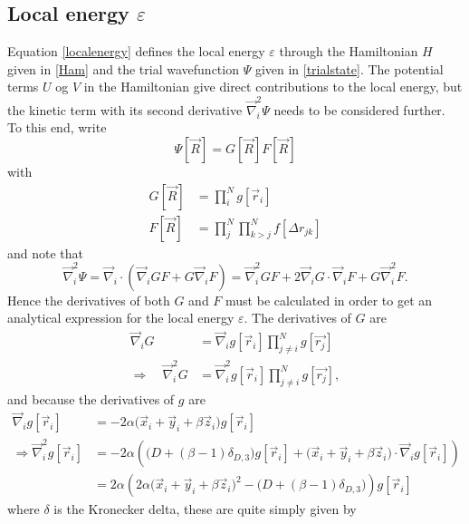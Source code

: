 \documentclass[a4paper,8pt]{article}
\begin{document}
\subsection{Local energy $\varepsilon$}\label{derLocalenergy}
Equation \eqref{localenergy} defines the local energy $\varepsilon$ through the Hamiltonian $H$ given in \eqref{Ham} and the trial wavefunction $\Psi$ given in \eqref{trialstate}. The potential terms $U$ og $V$ in the Hamiltonian give direct contributions to the local energy, but the kinetic term with its second derivative $\vec{\nabla}_i^2\Psi$ needs to be considered further. To this end, write
\begin{equation}
\Psi[\vec{R}] = G[\vec{R}]F[\vec{R}]
\end{equation}
with
\begin{align}
G[\vec{R}] &= \prod\limits_i^N g[\vec{r}_i] \label{G}\\
F[\vec{R}] &= \prod\limits_j^N\prod\limits_{k > j}^N f[\Delta{r}_{jk}] \label{F}
\end{align}
and note that
\begin{equation}
\vec{\nabla}_i^2\Psi = \vec{\nabla}_i\cdot\left(\vec{\nabla}_i G F + G \vec{\nabla}_i F\right) = \vec{\nabla}_i^2 G F + 2\vec{\nabla}_i G \cdot \vec{\nabla}_i F + G \vec{\nabla}_i^2 F. \label{Lap_Psi_1} 
\end{equation}
Hence the derivatives of both $G$ and $F$ must be calculated in order to get an analytical expression for the local energy $\varepsilon$. The derivatives of $G$ are 
\begin{align}
\vec{\nabla}_i G &= \vec{\nabla}_i g[\vec{r}_i] \prod\limits_{j \neq i}^N g[\vec{r_j}] \nonumber\\
\Longrightarrow\quad \vec{\nabla}_i^2 G &= \vec{\nabla}_i^2 g[\vec{r}_i] \prod\limits_{j \neq i}^N g[\vec{r_j}], \nonumber
\end{align}
and because the derivatives of $g$ are
\begin{align}
\vec{\nabla}_i g[\vec{r}_i] &= -2\alpha\Big(\vec{x}_i+\vec{y}_i+\beta\vec{z}_i\Big)g[\vec{r}_i] \\
\Longrightarrow \vec{\nabla}_i^2 g[\vec{r}_i] &= -2\alpha\left(\Big(D+(\beta-1)\delta_{D,3}\Big)g[\vec{r}_i]+\Big(\vec{x}_i+\vec{y}_i+\beta\vec{z}_i\Big)\cdot\vec{\nabla}_i g[\vec{r}_i]\right) \nonumber\\
&= 2\alpha\left(2\alpha\Big(\vec{x}_i+\vec{y}_i+\beta\vec{z}_i\Big)^2-\Big(D+(\beta-1)\delta_{D,3}\Big)\right)g[\vec{r}_i]
\end{align}
where $\delta$ is the Kronecker delta, these are quite simply given by
\end{document}
